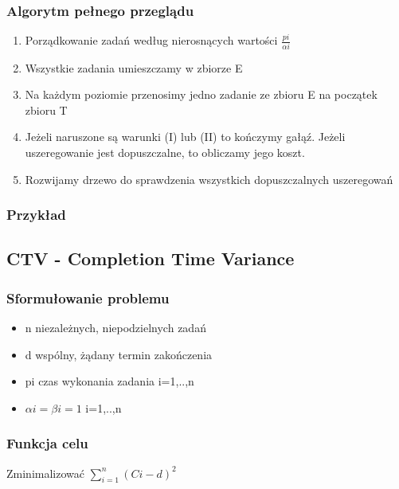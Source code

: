 \documentclass[12pt,a4paper]{article}
\begin{document}
\subsubsection{Algorytm pełnego przeglądu}
\begin{enumerate}
\item Porządkowanie zadań według nierosnących wartości $\frac{pi}{\alpha i}$
\item Wszystkie zadania umieszczamy w zbiorze E
\item Na każdym poziomie przenosimy jedno zadanie ze zbioru E na początek zbioru T
\item Jeżeli naruszone są warunki (I) lub (II) to kończymy gałąź. Jeżeli uszeregowanie jest dopuszczalne, to obliczamy jego koszt.
\item Rozwijamy drzewo do sprawdzenia wszystkich dopuszczalnych uszeregowań
\end{enumerate}
\subsubsection{Przykład}
\subsection{CTV - Completion Time Variance}
\subsubsection{Sformułowanie problemu}
\begin{itemize}
\item n niezależnych, niepodzielnych zadań
\item d wspólny, żądany termin zakończenia
\item pi czas wykonania zadania i=1,..,n
\item $\alpha i = \beta i = 1$ i=1,..,n
\end{itemize}
\subsubsection{Funkcja celu}
Zminimalizować $\sum\limits_{i=1}^{n}(Ci-d)^2$
\end{document}
